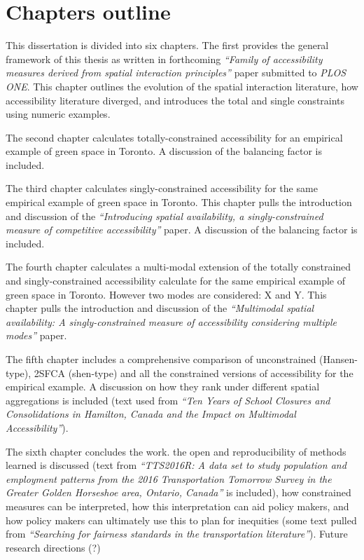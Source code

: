 \documentclass[
11pt, %
oneside, %
english, %
singlespacing, %
]{macthesis} %
\begin{document}
\section{Chapters outline}\label{chapters-outline}

This dissertation is divided into six chapters. The first provides the general framework of this thesis as written in forthcoming \emph{``Family of accessibility measures derived from spatial interaction principles''} paper submitted to \emph{PLOS ONE}. This chapter outlines the evolution of the spatial interaction literature, how accessibility literature diverged, and introduces the total and single constraints using numeric examples.

The second chapter calculates totally-constrained accessibility for an empirical example of green space in Toronto. A discussion of the balancing factor is included.

The third chapter calculates singly-constrained accessibility for the same empirical example of green space in Toronto. This chapter pulls the introduction and discussion of the \emph{``Introducing spatial availability, a singly-constrained measure of competitive accessibility''} paper. A discussion of the balancing factor is included.

The fourth chapter calculates a multi-modal extension of the totally constrained and singly-constrained accessibility calculate for the same empirical example of green space in Toronto. However two modes are considered: X and Y. This chapter pulls the introduction and discussion of the \emph{``Multimodal spatial availability: A singly-constrained measure of accessibility considering multiple modes''} paper.

The fifth chapter includes a comprehensive comparison of unconstrained (Hansen-type), 2SFCA (shen-type) and all the constrained versions of accessibility for the empirical example. A discussion on how they rank under different spatial aggregations is included (text used from \emph{``Ten Years of School Closures and Consolidations in Hamilton, Canada and the Impact on Multimodal Accessibility''}).

The sixth chapter concludes the work. the open and reproducibility of methods learned is discussed (text from \emph{``TTS2016R: A data set to study population and employment patterns from the 2016 Transportation Tomorrow Survey in the Greater Golden Horseshoe area, Ontario, Canada''} is included), how constrained measures can be interpreted, how this interpretation can aid policy makers, and how policy makers can ultimately use this to plan for inequities (some text pulled from \emph{``Searching for fairness standards in the transportation literature''}). Future research directions (?)
\end{document}
